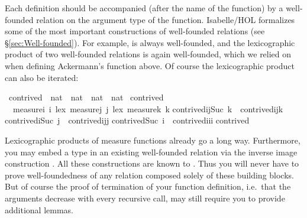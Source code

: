 \begin{isabellebody}
\begin{isamarkuptext}
Each  definition should be accompanied (after the name of
the function) by a well-founded relation on the argument type of the
function.  Isabelle/HOL formalizes some of the most important
constructions of well-founded relations (see \S\ref{sec:Well-founded}). For
example,  is always well-founded, and the lexicographic
product of two well-founded relations is again well-founded, which we relied
on when defining Ackermann's function above.
Of course the lexicographic product can also be iterated:%
\end{isamarkuptext}%
\ contrived\ {\isacharcolon}{\isacharcolon}\ {\isachardoublequote}nat\ {\isasymtimes}\ nat\ {\isasymtimes}\ nat\ {\isasymRightarrow}\ nat{\isachardoublequote}\isanewline
{}\ contrived\isanewline
\ \ {\isachardoublequote}measure{\isacharparenleft}{\isasymlambda}i{\isachardot}\ i{\isacharparenright}\ {\isacharless}{\isacharasterisk}lex{\isacharasterisk}{\isachargreater}\ measure{\isacharparenleft}{\isasymlambda}j{\isachardot}\ j{\isacharparenright}\ {\isacharless}{\isacharasterisk}lex{\isacharasterisk}{\isachargreater}\ measure{\isacharparenleft}{\isasymlambda}k{\isachardot}\ k{\isacharparenright}{\isachardoublequote}\isanewline
{\isachardoublequote}contrived{\isacharparenleft}i{\isacharcomma}j{\isacharcomma}Suc\ k{\isacharparenright}\ {\isacharequal}\ contrived{\isacharparenleft}i{\isacharcomma}j{\isacharcomma}k{\isacharparenright}{\isachardoublequote}\isanewline
{\isachardoublequote}contrived{\isacharparenleft}i{\isacharcomma}Suc\ j{\isacharcomma}{}{\isacharparenright}\ {\isacharequal}\ contrived{\isacharparenleft}i{\isacharcomma}j{\isacharcomma}j{\isacharparenright}{\isachardoublequote}\isanewline
{\isachardoublequote}contrived{\isacharparenleft}Suc\ i{\isacharcomma}{}{\isacharcomma}{}{\isacharparenright}\ {\isacharequal}\ contrived{\isacharparenleft}i{\isacharcomma}i{\isacharcomma}i{\isacharparenright}{\isachardoublequote}\isanewline
{\isachardoublequote}contrived{\isacharparenleft}{}{\isacharcomma}{}{\isacharcomma}{}{\isacharparenright}\ \ \ \ \ {\isacharequal}\ {}{\isachardoublequote}%
\begin{isamarkuptext}%
Lexicographic products of measure functions already go a long
way. Furthermore, you may embed a type in an
existing well-founded relation via the inverse image construction . All these constructions are known to . Thus you
will never have to prove well-foundedness of any relation composed
solely of these building blocks. But of course the proof of
termination of your function definition, i.e.\ that the arguments
decrease with every recursive call, may still require you to provide
additional lemmas.


\end{isamarkuptext}
\end{isabellebody}
